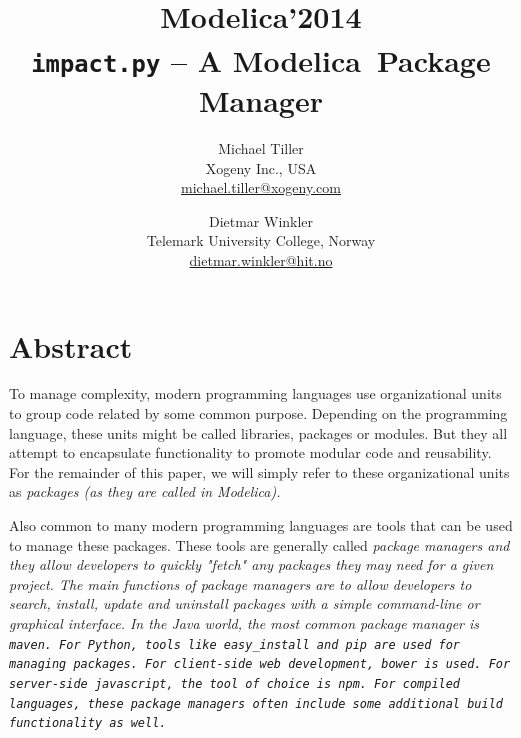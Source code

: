\documentclass[11pt,a4paper,twocolumn]{article}
\newcommand{\myr}{\textsuperscript{\textregistered}}
\begin{document}
\title{\textbf{{\small Modelica'2014}\\
    \texttt{impact.py} -- A Modelica\myr\ Package Manager}}

\author{Michael Tiller\\Xogeny Inc., USA\\\url{michael.tiller@xogeny.com} %
        \and Dietmar Winkler\\Telemark University College, Norway\\\url{dietmar.winkler@hit.no}}
\date{} %
\maketitle\thispagestyle{empty} %

\section*{Abstract}

To manage complexity, modern programming languages use organizational
units to group code related by some common purpose.  Depending on the
programming language, these units might be called libraries, packages
or modules.  But they all attempt to encapsulate functionality to
promote modular code and reusability.  For the remainder of this
paper, we will simply refer to these organizational units as
\em{packages} (as they are called in Modelica).

Also common to many modern programming languages are tools that can be
used to manage these packages.  These tools are generally called
\em{package managers} and they allow developers to quickly "fetch" any
packages they may need for a given project.  The main functions of
package managers are to allow developers to search, install, update
and uninstall packages with a simple command-line or graphical
interface.  In the Java world, the most common package manager is
\tt{maven}.  For Python, tools like \tt{easy_install} and \tt{pip} are
used for managing packages.  For client-side web development,
\tt{bower} is used.  For server-side javascript, the tool of choice is
\tt{npm}.  For compiled languages, these package managers often
include some additional build functionality as well.
\end{document}

